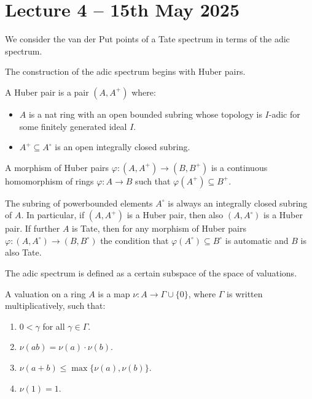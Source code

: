 \section{Lecture 4 -- 15th May 2025}\label{sec: lecture 4}
We consider the van der Put points of a Tate spectrum in terms of the adic spectrum. 

The construction of the adic spectrum begins with Huber pairs. 
\begin{definition}\label{def: Huber pair}
    A Huber pair is a pair $(A,A^{+})$ where:
    \begin{itemize}
        \item $A$ is a nat ring with an open bounded subring whose topology is $I$-adic for some finitely generated ideal $I$. 
        \item $A^{+}\subseteq A^{\circ}$ is an open integrally closed subring. 
    \end{itemize}
\end{definition}
\begin{definition}\label{def: morphism of Huber pairs}
    A morphism of Huber pairs $\varphi:(A,A^{+})\to(B,B^{+})$ is a continuous homomorphism of rings $\varphi:A\to B$ such that $\varphi(A^{+})\subseteq B^{+}$. 
\end{definition}
\begin{remark}
    The subring of powerbounded elements $A^{\circ}$ is always an integrally closed subring of $A$. In particular, if $(A,A^{+})$ is a Huber pair,
then also $(A,A^{\circ})$ is a Huber pair. If further $A$ is Tate, then for any morphism of Huber pairs $\varphi:(A,A^{\circ})\to (B,B^{\circ})$ the condition that $\varphi(A^{\circ})\subseteq B^{\circ}$ is automatic and $B$ is also Tate. 
\end{remark}
The adic spectrum is defined as a certain subspace of the space of valuations. 
\begin{definition}[Valuation]\label{def: valuation}
    A valuation on a ring $A$ is a map $\nu:A\to\Gamma\cup\{0\}$, where $\Gamma$ is written multiplicatively, such that:
    \begin{enumerate}[label=(\roman*)]
        \item $0<\gamma$ for all $\gamma\in\Gamma$. 
        \item $\nu(ab)=\nu(a)\cdot\nu(b)$. 
        \item $\nu(a+b)\leq\max\{\nu(a),\nu(b)\}$. 
        \item $\nu(1)=1$. 
    \end{enumerate}
\end{definition}
